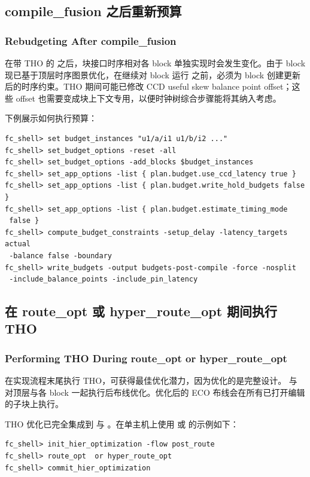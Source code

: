 \subsection{compile\_fusion 之后重新预算}
\subsubsection*{Rebudgeting After compile\_fusion}

在带 THO 的  之后，块接口时序相对各 block 单独实现时会发生变化。由于 block 现已基于顶层时序图景优化，在继续对 block 运行  之前，必须为 block 创建更新后的时序约束。THO 期间可能已修改 CCD useful skew balance point offset；这些 offset 也需要变成块上下文专用，以便时钟树综合步骤能将其纳入考虑。

下例展示如何执行预算：
\begin{lstlisting}
fc_shell> set budget_instances "u1/a/i1 u1/b/i2 ..."
fc_shell> set_budget_options -reset -all
fc_shell> set_budget_options -add_blocks $budget_instances
fc_shell> set_app_options -list { plan.budget.use_ccd_latency true }
fc_shell> set_app_options -list { plan.budget.write_hold_budgets false }
fc_shell> set_app_options -list { plan.budget.estimate_timing_mode
 false }
fc_shell> compute_budget_constraints -setup_delay -latency_targets actual
 -balance false -boundary
fc_shell> write_budgets -output budgets-post-compile -force -nosplit
 -include_balance_points -include_pin_latency
\end{lstlisting}

\subsection{在 route\_opt 或 hyper\_route\_opt 期间执行 THO}
\subsubsection*{Performing THO During route\_opt or hyper\_route\_opt}

在实现流程末尾执行 THO，可获得最佳优化潜力，因为优化的是完整设计。 与  对顶层与各 block 一起执行后布线优化。优化后的 ECO 布线会在所有已打开编辑的子块上执行。

THO 优化已完全集成到  与 。在单主机上使用  或  的示例如下：
\begin{lstlisting}
fc_shell> init_hier_optimization -flow post_route
fc_shell> route_opt  or hyper_route_opt
fc_shell> commit_hier_optimization
\end{lstlisting}

